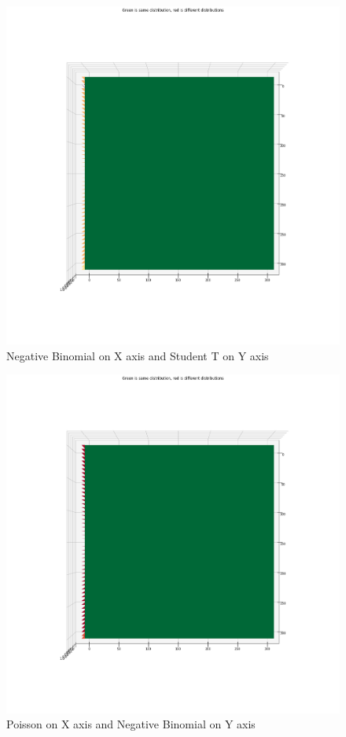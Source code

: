 \begin{figure}[htb]
  \centering
  \includegraphics[width=\linewidth]{./img/hypothesis_test/appendix/naive_X_neg_bin_Y_student_t.png}
  \caption{Negative Binomial on X axis and Student T on Y axis}
\end{figure}
\clearpage
\begin{figure}[htb]
  \centering
  \includegraphics[width=\linewidth]{./img/hypothesis_test/appendix/naive_X_poisson_Y_neg_bin.png}
  \caption{Poisson on X axis and Negative Binomial on Y axis}
\end{figure}
